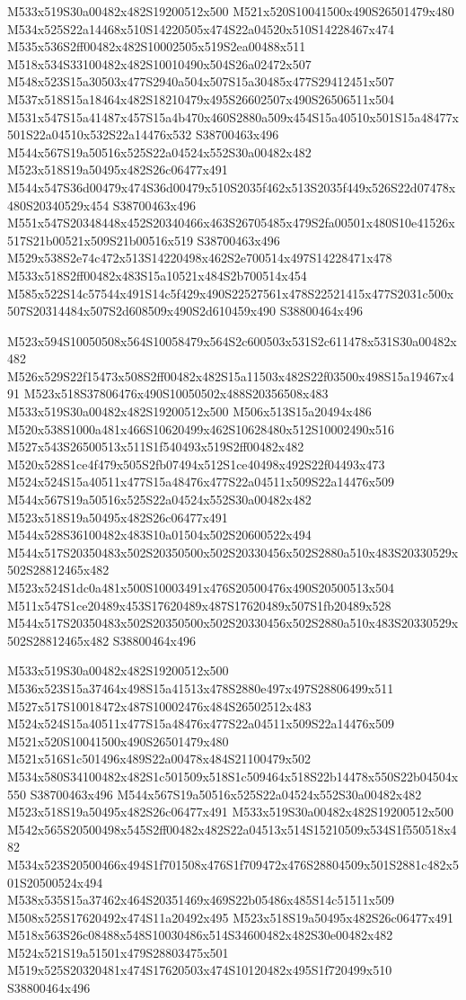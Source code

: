 \documentclass{article}
\begin{document}
\begin{multicols}{2}
M533x519S30a00482x482S19200512x500 M521x520S10041500x490S26501479x480 M534x525S22a14468x510S14220505x474S22a04520x510S14228467x474 M535x536S2ff00482x482S10002505x519S2ea00488x511 M518x534S33100482x482S10010490x504S26a02472x507 M548x523S15a30503x477S2940a504x507S15a30485x477S29412451x507 M537x518S15a18464x482S18210479x495S26602507x490S26506511x504 M531x547S15a41487x457S15a4b470x460S2880a509x454S15a40510x501S15a48477x501S22a04510x532S22a14476x532 S38700463x496 M544x567S19a50516x525S22a04524x552S30a00482x482 M523x518S19a50495x482S26c06477x491 M544x547S36d00479x474S36d00479x510S2035f462x513S2035f449x526S22d07478x480S20340529x454 S38700463x496 M551x547S20348448x452S20340466x463S26705485x479S2fa00501x480S10e41526x517S21b00521x509S21b00516x519 S38700463x496 M529x538S2e74c472x513S14220498x462S2e700514x497S14228471x478 M533x518S2ff00482x483S15a10521x484S2b700514x454 M585x522S14c57544x491S14c5f429x490S22527561x478S22521415x477S2031c500x507S20314484x507S2d608509x490S2d610459x490 S38800464x496

M523x594S10050508x564S10058479x564S2c600503x531S2c611478x531S30a00482x482 M526x529S22f15473x508S2ff00482x482S15a11503x482S22f03500x498S15a19467x491 M523x518S37806476x490S10050502x488S20356508x483 M533x519S30a00482x482S19200512x500 M506x513S15a20494x486 M520x538S1000a481x466S10620499x462S10628480x512S10002490x516 M527x543S26500513x511S1f540493x519S2ff00482x482 M520x528S1ce4f479x505S2fb07494x512S1ce40498x492S22f04493x473 M524x524S15a40511x477S15a48476x477S22a04511x509S22a14476x509 M544x567S19a50516x525S22a04524x552S30a00482x482 M523x518S19a50495x482S26c06477x491 M544x528S36100482x483S10a01504x502S20600522x494 M544x517S20350483x502S20350500x502S20330456x502S2880a510x483S20330529x502S28812465x482 M523x524S1dc0a481x500S10003491x476S20500476x490S20500513x504 M511x547S1ce20489x453S17620489x487S17620489x507S1fb20489x528 M544x517S20350483x502S20350500x502S20330456x502S2880a510x483S20330529x502S28812465x482 S38800464x496

M533x519S30a00482x482S19200512x500 M536x523S15a37464x498S15a41513x478S2880e497x497S28806499x511 M527x517S10018472x487S10002476x484S26502512x483 M524x524S15a40511x477S15a48476x477S22a04511x509S22a14476x509 M521x520S10041500x490S26501479x480 M521x516S1c501496x489S22a00478x484S21100479x502 M534x580S34100482x482S1c501509x518S1c509464x518S22b14478x550S22b04504x550 S38700463x496 M544x567S19a50516x525S22a04524x552S30a00482x482 M523x518S19a50495x482S26c06477x491 M533x519S30a00482x482S19200512x500 M542x565S20500498x545S2ff00482x482S22a04513x514S15210509x534S1f550518x482 M534x523S20500466x494S1f701508x476S1f709472x476S28804509x501S2881c482x501S20500524x494 M538x535S15a37462x464S20351469x469S22b05486x485S14c51511x509 M508x525S17620492x474S11a20492x495 M523x518S19a50495x482S26c06477x491 M518x563S26c08488x548S10030486x514S34600482x482S30e00482x482 M524x521S19a51501x479S28803475x501 M519x525S20320481x474S17620503x474S10120482x495S1f720499x510 S38800464x496


\end{multicols}
\end{document}
